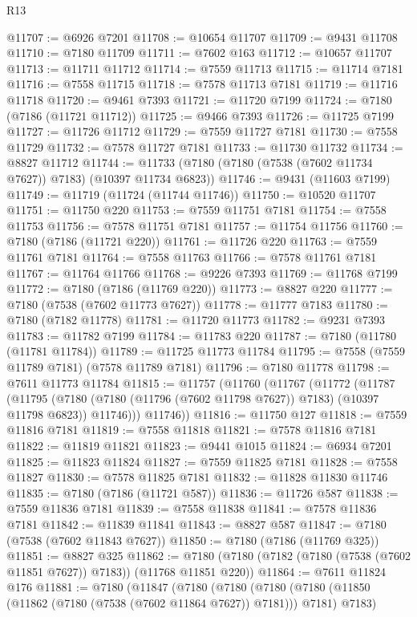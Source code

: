 \begin{lexlean}{R13}
\begin{coremodule}
@11707 := @6926 @7201
@11708 := @10654 @11707
@11709 := @9431 @11708
@11710 := @7180 @11709
@11711 := @7602 @163
@11712 := @10657 @11707
@11713 := @11711 @11712
@11714 := @7559 @11713
@11715 := @11714 @7181
@11716 := @7558 @11715
@11718 := @7578 @11713 @7181
@11719 := @11716 @11718
@11720 := @9461 @7393
@11721 := @11720 @7199
@11724 := @7180 (@7186 (@11721 @11712))
@11725 := @9466 @7393
@11726 := @11725 @7199
@11727 := @11726 @11712
@11729 := @7559 @11727 @7181
@11730 := @7558 @11729
@11732 := @7578 @11727 @7181
@11733 := @11730 @11732
@11734 := @8827 @11712
@11744 := @11733 (@7180 (@7180 (@7538 (@7602 @11734 @7627)) @7183) (@10397 @11734 @6823))
@11746 := @9431 (@11603 @7199)
@11749 := @11719 (@11724 (@11744 @11746))
@11750 := @10520 @11707
@11751 := @11750 @220
@11753 := @7559 @11751 @7181
@11754 := @7558 @11753
@11756 := @7578 @11751 @7181
@11757 := @11754 @11756
@11760 := @7180 (@7186 (@11721 @220))
@11761 := @11726 @220
@11763 := @7559 @11761 @7181
@11764 := @7558 @11763
@11766 := @7578 @11761 @7181
@11767 := @11764 @11766
@11768 := @9226 @7393
@11769 := @11768 @7199
@11772 := @7180 (@7186 (@11769 @220))
@11773 := @8827 @220
@11777 := @7180 (@7538 (@7602 @11773 @7627))
@11778 := @11777 @7183
@11780 := @7180 (@7182 @11778)
@11781 := @11720 @11773
@11782 := @9231 @7393
@11783 := @11782 @7199
@11784 := @11783 @220
@11787 := @7180 (@11780 (@11781 @11784))
@11789 := @11725 @11773 @11784
@11795 := @7558 (@7559 @11789 @7181) (@7578 @11789 @7181)
@11796 := @7180 @11778
@11798 := @7611 @11773 @11784
@11815 := @11757
    (@11760
      (@11767
        (@11772
          (@11787
            (@11795
              (@7180 (@7180 (@11796 (@7602 @11798 @7627)) @7183) (@10397 @11798 @6823))
              @11746)))
        @11746))
@11816 := @11750 @127
@11818 := @7559 @11816 @7181
@11819 := @7558 @11818
@11821 := @7578 @11816 @7181
@11822 := @11819 @11821
@11823 := @9441 @1015
@11824 := @6934 @7201
@11825 := @11823 @11824
@11827 := @7559 @11825 @7181
@11828 := @7558 @11827
@11830 := @7578 @11825 @7181
@11832 := @11828 @11830 @11746
@11835 := @7180 (@7186 (@11721 @587))
@11836 := @11726 @587
@11838 := @7559 @11836 @7181
@11839 := @7558 @11838
@11841 := @7578 @11836 @7181
@11842 := @11839 @11841
@11843 := @8827 @587
@11847 := @7180 (@7538 (@7602 @11843 @7627))
@11850 := @7180 (@7186 (@11769 @325))
@11851 := @8827 @325
@11862 := @7180 (@7180 (@7182 (@7180 (@7538 (@7602 @11851 @7627)) @7183)) (@11768 @11851 @220))
@11864 := @7611 @11824 @176
@11881 := @7180
    (@11847
      (@7180
        (@7180
          (@7180 (@7180 (@11850 (@11862 (@7180 (@7538 (@7602 @11864 @7627)) @7181))) @7181) @7183)

\end{coremodule}
\end{lexlean}

